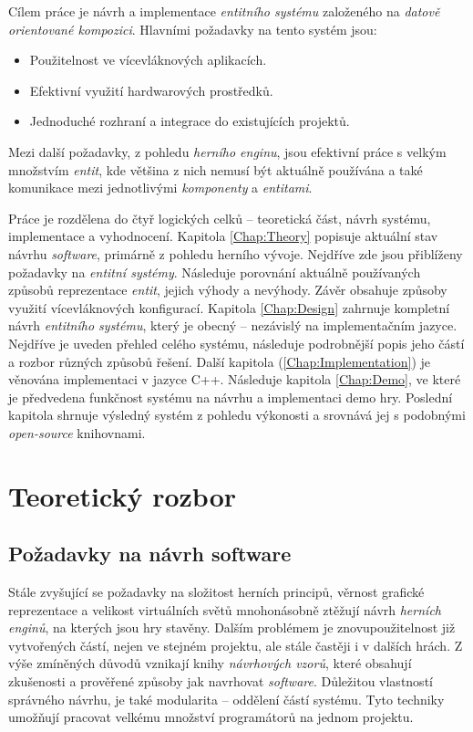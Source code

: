 Cílem práce je návrh a implementace \emph{entitního systému} založeného na \emph{datově orientované kompozici}. Hlavními požadavky na tento systém jsou: 
\begin{itemize}
	\item Použitelnost ve vícevláknových aplikacích.
	\item Efektivní využití hardwarových prostředků.
	\item Jednoduché rozhraní a integrace do existujících projektů.
\end{itemize}
Mezi další požadavky, z pohledu \emph{herního enginu}, jsou efektivní práce s velkým množstvím \emph{entit}, kde většina z nich nemusí být aktuálně používána a také komunikace mezi jednotlivými \emph{komponenty} a \emph{entitami}.

Práce je rozdělena do čtyř logických celků -- teoretická část, návrh systému, implementace a vyhodnocení. Kapitola \ref{Chap:Theory} popisuje aktuální stav návrhu \emph{software}, primárně z pohledu herního vývoje. Nejdříve zde jsou přiblíženy požadavky na \emph{entitní systémy}. Následuje porovnání aktuálně používaných způsobů reprezentace \emph{entit}, jejich výhody a nevýhody. Závěr obsahuje způsoby využití vícevláknových konfigurací. Kapitola \ref{Chap:Design} zahrnuje kompletní návrh \emph{entitního systému}, který je obecný -- nezávislý na implementačním jazyce. Nejdříve je uveden přehled celého systému, následuje podrobnější popis jeho částí a rozbor různých způsobů řešení. Další kapitola (\ref{Chap:Implementation}) je věnována implementaci v jazyce C++. Následuje kapitola \ref{Chap:Demo}, ve které je předvedena funkčnost systému na návrhu a implementaci demo hry. Poslední kapitola shrnuje výsledný systém z pohledu výkonosti a srovnává jej s podobnými \emph{open-source} knihovnami.

\chapter{Teoretický rozbor}
\blind[1]

\section{Požadavky na návrh software}
\blind[2]

Stále zvyšující se požadavky na složitost herních principů, věrnost grafické reprezentace a velikost virtuálních světů mnohonásobně ztěžují návrh \emph{herních enginů}, na kterých jsou hry stavěny. Dalším problémem je znovupoužitelnost již vytvořených částí, nejen ve stejném projektu, ale stále častěji i v dalších hrách. Z výše zmíněných důvodů vznikají knihy \emph{návrhových vzorů}\cite{DesignPatterns}\cite{GameDesignPatterns}, které obsahují zkušenosti a prověřené způsoby jak navrhovat \emph{software}. Důležitou vlastností správného návrhu, je také modularita -- oddělení částí systému. Tyto techniky umožňují pracovat velkému množství programátorů na jednom projektu.

